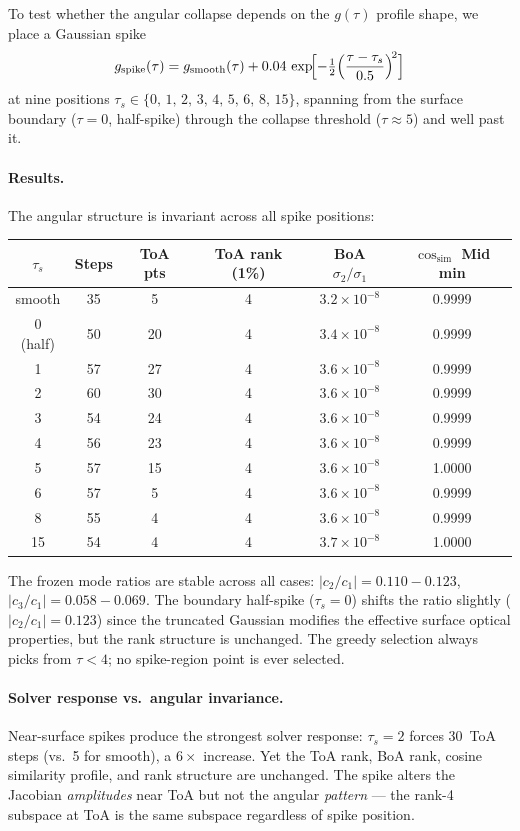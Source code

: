 \documentclass[11pt]{article}
\begin{document}
To test whether the angular collapse depends on the
$g(\tau)$ profile shape, we place a Gaussian spike
\[
  g_\mathrm{spike}(\tau) = g_\mathrm{smooth}(\tau)
  + 0.04\,\exp\!\Bigl[-\tfrac{1}{2}\Bigl(\frac{\tau-\tau_s}{0.5}\Bigr)^{\!2}\Bigr]
\]
at nine positions $\tau_s \in \{0,\,1,\,2,\,3,\,4,\,5,\,6,\,8,\,15\}$,
spanning from the surface boundary ($\tau=0$, half-spike) through the
collapse threshold ($\tau\approx 5$) and well past it.

\paragraph{Results.}
The angular structure is invariant across all spike positions:

\begin{center}
\begin{tabular}{c c c c c c}
\toprule
$\tau_s$ & Steps & ToA pts & ToA rank (1\%)
  & BoA $\sigma_2/\sigma_1$ & $\cos_\mathrm{sim}$ Mid min\\
\midrule
smooth  & 35 &  5 & 4 & $3.2\times10^{-8}$ & 0.9999\\
0 (half)& 50 & 20 & 4 & $3.4\times10^{-8}$ & 0.9999\\
1       & 57 & 27 & 4 & $3.6\times10^{-8}$ & 0.9999\\
2       & 60 & 30 & 4 & $3.6\times10^{-8}$ & 0.9999\\
3       & 54 & 24 & 4 & $3.6\times10^{-8}$ & 0.9999\\
4       & 56 & 23 & 4 & $3.6\times10^{-8}$ & 0.9999\\
5       & 57 & 15 & 4 & $3.6\times10^{-8}$ & 1.0000\\
6       & 57 &  5 & 4 & $3.6\times10^{-8}$ & 0.9999\\
8       & 55 &  4 & 4 & $3.6\times10^{-8}$ & 0.9999\\
15      & 54 &  4 & 4 & $3.7\times10^{-8}$ & 1.0000\\
\bottomrule
\end{tabular}
\end{center}

The frozen mode ratios are stable across all cases:
$|c_2/c_1| = 0.110{-}0.123$, $|c_3/c_1| = 0.058{-}0.069$.
The boundary half-spike ($\tau_s=0$) shifts the ratio
slightly ($|c_2/c_1|=0.123$) since the truncated Gaussian
modifies the effective surface optical properties, but the
rank structure is unchanged.
The greedy selection always picks
from $\tau<4$; no spike-region point is ever selected.

\paragraph{Solver response vs.\ angular invariance.}
Near-surface spikes produce the strongest solver response:
$\tau_s=2$ forces 30~ToA steps (vs.\ 5 for smooth), a
$6\times$ increase.  Yet the ToA rank, BoA rank, cosine
similarity profile, and rank structure are unchanged.
The spike alters the Jacobian \emph{amplitudes} near ToA
but not the angular \emph{pattern} --- the rank-4 subspace
at ToA is the same subspace regardless of spike position.
\end{document}
